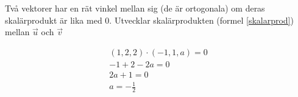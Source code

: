 \documentclass[../../main.tex]{subfiles}
\begin{document}
\begin{solution}{15}

Två vektorer har en rät vinkel mellan sig (de är ortogonala) om deras skalärprodukt är lika med 0. Utvecklar skalärprodukten (formel \ref{skalarprod}) mellan $\Vec{u}$ och $\Vec{v}$

\begin{align*}
(1, 2, 2) \cdot (-1, 1, a) = 0\\
-1 + 2 - 2a = 0\\
2a + 1 = 0\\
a = -\frac{1}{2}
\end{align*}


\end{solution}
\end{document}
